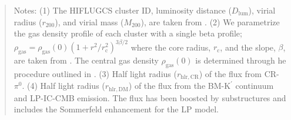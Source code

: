 \documentclass[10pt,aps,pra,reprint,amsmath,amsfonts,amssymb,showpacs,nofootinbib,floatfix]{revtex4-1}
\newcommand{\rmn}{\mathrm}
\newcommand{\Kp}{\rmn{K}^\prime}
\newcommand{\rvir}{r_{200}}
\newcommand{\mvir}{M_{200}}
\begin{document}
\begin{table}
\begin{minipage}{2.0\columnwidth}
\begin{quote}
  Notes: 
  (1) The HIFLUGCS cluster ID, luminosity distance
  ($D_\rmn{lum}$), virial radius ($\rvir$), and virial mass ($\mvir$),
  are taken from \cite{2002ApJ...567..716R}.
  (2) We parametrize the
  gas density profile of each cluster with a single beta profile;
  $\rho_\rmn{gas}=\rho_\rmn{gas}(0)(1+r^2/r_\rmn{c}^2)^{3\beta/2}$
  where the core radius, $r_\rmn{c}$, and the slope, $\beta$, are taken from
  \cite{2002ApJ...567..716R}. The central gas density
  $\rho_\rmn{gas}(0)$ is determined through he procedure outlined in
  \cite{1999ApJ...517..627M}.
  (3) Half light radius ($r_\rmn{hlr,CR}$) of the flux from CR-$\pi^0$.
  (4) Half light radius ($r_\rmn{hlr,DM}$) of the flux from the BM-$\Kp$ 
  continuum and LP-IC-CMB emission. The flux has been
  boosted by substructures and includes the
  Sommerfeld enhancement for the LP model. 
  \end{quote}
\end{minipage}
\end{table} 
\end{document}
